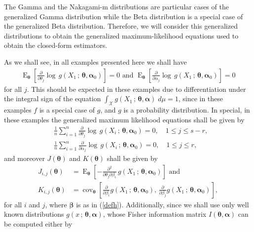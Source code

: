 \documentclass[12pt]{article} %
\newcommand{\bs}{\boldsymbol}
\newcommand{\on}{\operatorname}
\theoremstyle{definition}
\begin{document}
The Gamma and the Nakagami-m distributions are particular cases of the generalized Gamma distribution while the Beta distribution is a special case of the generalized Beta distribution. Therefore, we will consider this generalized distributions to obtain the generalized maximum-likelihood equations used to obtain the closed-form estimators. 

As we shall see, in all examples presented here we shall have
\begin{equation}\label{allex}
\begin{aligned}\on{E}_{\bs{\theta}}\left[\frac{\partial}{\partial \theta_j}  \log\, g(X_1\,;\,\bs{\theta},\bs{\alpha}_0)\right] = 0\mbox{ and }
\on{E}_{\bs{\theta}}\left[\frac{\partial}{\partial \alpha_j}  \log\, g(X_1\,;\,\bs{\theta},\bs{\alpha}_0)\right] = 0
\end{aligned}
\end{equation}
for all $j$. This should be expected in these examples due to differentiation under the integral sign of the equation $\int_{\mathcal{X}}  g(X_1\,;\,\bs{\theta},\bs{\alpha})\; d\mu =1$, since in these examples $f$ is a special case of $g$, and $g$ is a probability distribution. In special, in these examples the generalized maximum likelihood equations shall be given by
\begin{equation}\label{modified}
\begin{aligned}
&\frac{1}{n}\sum_{i=1}^n \frac{\partial}{\partial \theta_j}  \log\, g(X_i\,;\,\bs{\theta},\bs{\alpha}_0) = 0,\quad 1\leq j\leq s-r,\\ &\frac{1}{n}
\sum_{i=1}^n \frac{\partial}{\partial \alpha_j}  \log\, g(X_i\,;\,\bs{\theta},\bs{\alpha}_0)=0, \quad  1\leq j\leq r,
\end{aligned}
\end{equation}
and moreover  $J(\bs{\theta})$ and $K(\bs{\theta})$ shall be given by
 \begin{equation}\label{eqj}
 \begin{aligned}J_{i,j}(\bs{\theta})&=
 \on{E}_{\bs{\theta}} \left[-\frac{\partial^2}{\partial\theta_j\partial \beta_i}\, g(X_1\, ;\, \bs{\theta},\bs{\alpha}_0)\right]\mbox{ and}\\
 K_{i,j}(\bs{\theta}) &=  \on{cov}_{\bs{\theta}} \left[\frac{\partial}{\partial \beta_i} g(X_1\, ;\, \bs{\theta},\bs{\alpha}_0),\,  \frac{\partial}{\partial \beta_j} g(X_1\, ;\, \bs{\theta},\bs{\alpha}_0)\right],
 \end{aligned}
 \end{equation}
 for all $i$ and $j$, where $\bs{\beta}$ is as in (\ref{defh}). Additionally, since we shall use only well known distributions $g(x\,;\, \bs{\theta},\bs{\alpha})$, whose  Fisher information matrix $I(\bs{\theta},\bs{\alpha})$ can be computed either by
\end{document}
